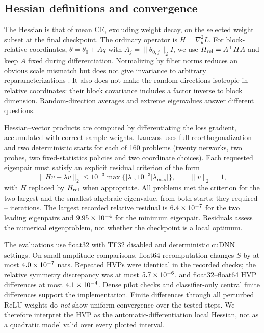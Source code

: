 \subsection{Hessian definitions and convergence}
\label{app:hessian-checks}
The Hessian is that of mean CE, excluding weight decay, on the selected weight subset at the final checkpoint. The ordinary operator is $H=\nabla^2_\theta L$. For block-relative coordinates, $\theta=\theta_0+Aq$ with $A_j=\|\theta_{0,j}\|_2 I$, we use $H_{\rm rel}=A^\top H A$ and keep $A$ fixed during differentiation. Normalizing by filter norms reduces an obvious scale mismatch but does not give invariance to arbitrary reparameterizations \citep{dinh2017sharp}. It also does not make the random directions isotropic in relative coordinates: their block covariance includes a factor inverse to block dimension. Random-direction averages and extreme eigenvalues answer different questions.

Hessian--vector products are computed by differentiating the loss gradient, accumulated with correct sample weights. Lanczos uses full reorthogonalization and two deterministic starts for each of 160 problems (twenty networks, two probes, two fixed-statistics policies and two coordinate choices). Each requested eigenpair must satisfy an explicit residual criterion of the form
\[
 \|Hv-\lambda v\|_2\le10^{-3}
 \max\{|\lambda|,10^{-3}|\lambda_{\max}|\},\qquad \|v\|_2=1,
\]
with $H$ replaced by $H_{\rm rel}$ when appropriate. All \tHessProblems{} problems met the criterion for the two largest and the smallest algebraic eigenvalue, from both starts; they required \tHessIterMin--\tHessIterMax{} iterations. The largest recorded relative residual is $6.4\times10^{-7}$ for the two leading eigenpairs and $9.95\times10^{-4}$ for the minimum eigenpair. Residuals assess the numerical eigenproblem, not whether the checkpoint is a local optimum.


The evaluations use float32 with TF32 disabled and deterministic cuDNN settings. On \tFloatChecks{} small-amplitude comparisons, float64 recomputation changes $S$ by at most $4.0\times10^{-7}$ nats. Repeated HVPs were identical in the recorded checks; the relative symmetry discrepancy was at most $5.7\times10^{-6}$, and float32--float64 HVP differences at most $4.1\times10^{-4}$. Dense pilot checks and classifier-only central finite differences support the implementation. Finite differences through all perturbed ReLU weights do \emph{not} show uniform convergence over the tested steps. We therefore interpret the HVP as the automatic-differentiation local Hessian, not as a quadratic model valid over every plotted interval.

